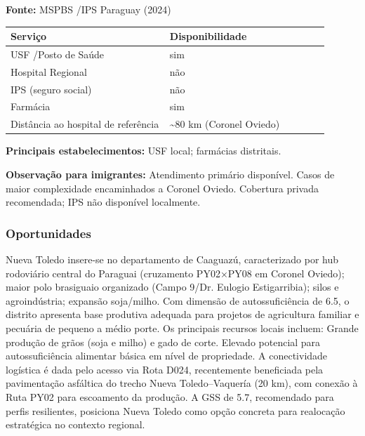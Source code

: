 \textbf{Fonte:} MSPBS /\allowbreak  IPS Paraguay (2024)

{\def\LTcaptype{none} %
\begin{longtable}{@{}>{\raggedright\arraybackslash}p{0.45\linewidth} >{\raggedright\arraybackslash}p{0.45\linewidth}@{}}
\toprule\noalign{}
Serviço & Disponibilidade \\
\midrule\noalign{}
\endhead
\bottomrule\noalign{}
\endlastfoot
USF /\allowbreak  Posto de Saúde & sim \\
Hospital Regional & não \\
IPS (seguro social) & não \\
Farmácia & sim \\
Distância ao hospital de referência & \textasciitilde80 km (Coronel
Oviedo) \\
\end{longtable}
}

\textbf{Principais estabelecimentos:} USF local; farmácias distritais.

\textbf{Observação para imigrantes:} Atendimento primário disponível.
Casos de maior complexidade encaminhados a Coronel Oviedo. Cobertura
privada recomendada; IPS não disponível localmente.
\newpage

\subsubsection*{Oportunidades}\label{oport-nueva-toledo-0522}
Nueva Toledo insere-se no departamento de Caaguazú, caracterizado por hub rodoviário central do Paraguai (cruzamento PY02×PY08 em Coronel Oviedo); maior polo brasiguaio organizado (Campo 9/Dr. Eulogio Estigarribia); silos e agroindústria; expansão soja/milho. Com dimensão de autossuficiência de 6.5, o distrito apresenta base produtiva adequada para projetos de agricultura familiar e pecuária de pequeno a médio porte. Os principais recursos locais incluem: Grande produção de grãos (soja e milho) e gado de corte. Elevado potencial para autossuficiência alimentar básica em nível de propriedade. A conectividade logística é dada pelo acesso via Rota D024, recentemente beneficiada pela pavimentação asfáltica do trecho Nueva Toledo--Vaquería (20 km), com conexão à Ruta PY02 para escoamento da produção. A GSS de 5.7, recomendado para perfis resilientes, posiciona Nueva Toledo como opção concreta para realocação estratégica no contexto regional.

